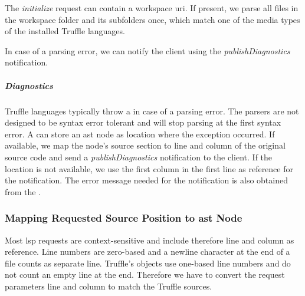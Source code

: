     The \emph{initialize} request can contain a workspace \ac{uri}. If present, we parse all files in the workspace folder and its subfolders once, which match one of the media types of the installed Truffle languages.

    In case of a parsing error, we can notify the client using the \emph{publishDiagnostics} notification.

    \subparagraph{Diagnostics}
    Truffle languages typically throw a  in case of a parsing error. The parsers are not designed to be syntax error tolerant and will stop parsing at the first syntax error. A  can store an \ac{ast} node as location where the exception occurred. If available, we map the node's source section to line and column of the original source code and send a \emph{publishDiagnostics} notification to the client. If the location is not available, we use the first column in the first line as reference for the notification. The error message needed for the notification is also obtained from the .

\subsubsection{Mapping Requested Source Position to \acs{ast} Node}
\label{sec:impl:mappingToAstNode}
    Most \ac{lsp} requests are context-sensitive and include therefore line and column as reference. Line numbers are zero-based and a newline character at the end of a file counts as separate line. Truffle's  objects use one-based line numbers and do not count an empty line at the end. Therefore we have to convert the request parameters line and column to match the Truffle sources.
    
